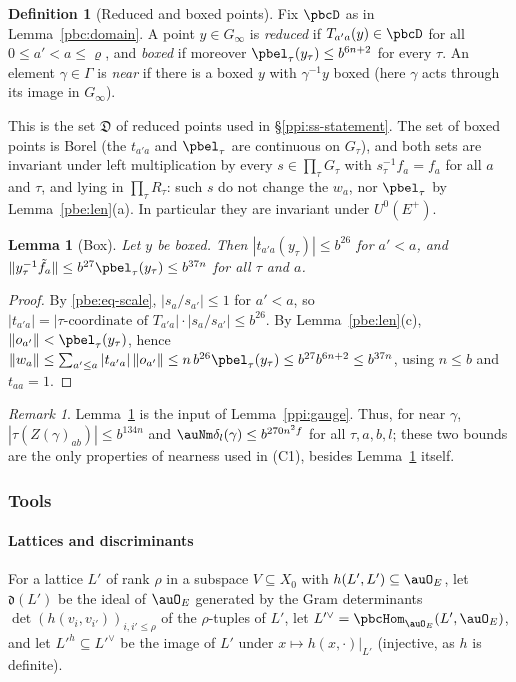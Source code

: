 \documentclass[10pt]{amsart}
\newtheorem{lemma}[theorem]{Lemma}
\theoremstyle{definition}
\newtheorem{definition}[theorem]{Definition}
\theoremstyle{remark}
\newtheorem{remark}[theorem]{Remark}
\begin{document}
\begin{definition}[Reduced and boxed points]\label{pbc:def-reduced}
Fix $\pbcD$ as in Lemma~\ref{pbc:domain}. A point $y\in G_\infty$ is \emph{reduced} if $T_{a'a}(y)\in
\pbcD$ for all $0\le a'<a\le\varrho$, and \emph{boxed} if moreover $\pbel_\tau(y_\tau)\le b^{6n+2}$ for
every $\tau$. An element $\gamma\in\Gamma$ is \emph{near} if there is a boxed $y$ with $\gamma^{-1}y$
boxed (here $\gamma$ acts through its image in $G_\infty$).
\end{definition}

This is the set $\mathfrak D$ of reduced points used in \S\ref{ppi:ss-statement}. The set of boxed points
is Borel (the $t_{a'a}$ and $\pbel_\tau$ are continuous on $G_\tau$), and both sets are invariant under
left multiplication by every $s\in\prod_\tau G_\tau$ with $s_\tau^{-1}f_a=f_a$ for all $a$ and
$\tau$, and lying in $\prod_\tau R_\tau$: such $s$ do not change the $w_a$, nor $\pbel_\tau$ by
Lemma~\ref{pbe:len}(a). In particular they are invariant under $U^0(E^+)$.

\begin{lemma}[Box]\label{pbc:box}
Let $y$ be boxed. Then $|t_{a'a}(y_\tau)|\le b^{26}$ for $a'<a$, and $\|y_\tau^{-1}\tilde f_a\|\le
b^{27}\pbel_\tau(y_\tau)\le b^{37n}$ for all $\tau$ and $a$.
\end{lemma}
\begin{proof}
By \eqref{pbe:eq-scale}, $|s_a/s_{a'}|\le1$ for $a'<a$, so $|t_{a'a}|=|\tau\text{-coordinate of }T_{a'a}|
\cdot|s_a/s_{a'}|\le b^{26}$. By Lemma~\ref{pbe:len}(c), $\|o_{a'}\|<\pbel_\tau(y_\tau)$, hence $\|w_a\|\le
\sum_{a'\le a}|t_{a'a}|\,\|o_{a'}\|\le n\,b^{26}\pbel_\tau(y_\tau)\le b^{27}b^{6n+2}\le b^{37n}$, using
$n\le b$ and $t_{aa}=1$.
\end{proof}

\begin{remark}\label{pbc:rem-box}
Lemma~\ref{pbc:box} is the input of Lemma~\ref{ppi:gauge}. Thus, for near $\gamma$, $|\tau(Z(\gamma)_{
ab})|\le b^{134n}$ and $\auNm\delta_l(\gamma)\le b^{270n^2f}$ for all $\tau,a,b,l$; these two bounds are
the only properties of nearness used in (C1), besides Lemma~\ref{pbc:box} itself.
\end{remark}

\subsubsection{Tools}\label{pbc:ss-tools}

\paragraph*{Lattices and discriminants}
For a lattice $L'$ of rank $\rho$ in a subspace $V\subseteq X_0$ with $h(L',L')\subseteq\auO_E$, let
$\mathfrak d(L')$ be the ideal of $\auO_E$ generated by the Gram determinants $\det(h(v_i,v_{i'}))_{i,
i'\le\rho}$ of the $\rho$-tuples of $L'$, let $L'^\vee=\pbcHom_{\auO_E}(L',\auO_E)$, and let $L'^h
\subseteq L'^\vee$ be the image of $L'$ under $x\mapsto h(x,\cdot)|_{L'}$ (injective, as $h$ is definite).
\end{document}
